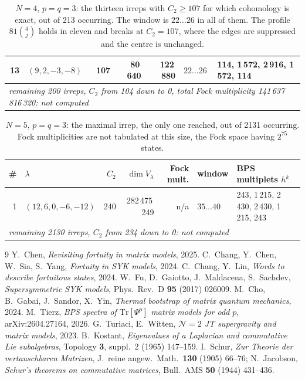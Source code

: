 \documentclass[10pt]{article}
\begin{document}
\begin{table}[p]
\begin{tabular}{rlrrrll}
13 & $(9,2,-3,-8)$ & 107 & 80\,640 & 122\,880 & $22\ldots26$ & 114, 1\,572, 2\,916, 1\,572, 114\\
\midrule
\multicolumn{7}{l}{\emph{remaining 200 irreps, $C_2$ from 104 down to 0, total Fock multiplicity 141\,637\,816\,320: not computed}}\\
\bottomrule\end{tabular}
\caption{$N=4$, $p=q=3$: the thirteen irreps with $C_2\ge107$ for which cohomology is exact, out of 213 occurring. The window is $22\ldots26$ in all of them. The profile $81\binom4j$ holds in eleven and breaks at $C_2=107$, where the edges are suppressed and the centre is unchanged.}\label{tab:app4}
\end{table}

\begin{table}[p]\centering\small
\begin{tabular}{rlrrrll}
\toprule
\# & $\lambda$ & $C_2$ & $\dim V_\lambda$ & Fock mult. & window & BPS multiplets $h^k$\\
\midrule
1 & $(12,6,0,-6,-12)$ & 240 & 282\,475\,249 & n/a & $35\ldots40$ & 243, 1\,215, 2\,430, 2\,430, 1\,215, 243\\
\midrule
\multicolumn{7}{l}{\emph{remaining 2130 irreps, $C_2$ from 234 down to 0: not computed}}\\
\bottomrule\end{tabular}
\caption{$N=5$, $p=q=3$: the maximal irrep, the only one reached, out of 2131 occurring. Fock multiplicities are not tabulated at this size, the Fock space having $2^{75}$ states.}\label{tab:app5}
\end{table}

\begin{thebibliography}{9}\small
{} Y.~Chen, \emph{Revisiting fortuity in matrix models}, 2025.
 C.~Chang, Y.~Chen, W.~Sia, S.~Yang, \emph{Fortuity in SYK models}, 2024.
 C.~Chang, Y.~Lin, \emph{Words to describe fortuitous states}, 2024.
 W.~Fu, D.~Gaiotto, J.~Maldacena, S.~Sachdev, \emph{Supersymmetric SYK models},
Phys.\ Rev.\ D \textbf{95} (2017) 026009.
 M.~Cho, B.~Gabai, J.~Sandor, X.~Yin, \emph{Thermal bootstrap of matrix quantum mechanics}, 2024.
 M.~Tierz, \emph{BPS spectra of $\mathrm{Tr}[\Psi^p]$ matrix models for odd $p$},
arXiv:2604.27164, 2026.
 G.~Turiaci, E.~Witten, \emph{$\mathcal N=2$ JT supergravity and matrix models}, 2023.
 B.~Kostant, \emph{Eigenvalues of a Laplacian and commutative Lie subalgebras}, Topology
\textbf{3}, suppl.~2 (1965) 147--159.
 I.~Schur, \emph{Zur Theorie der vertauschbaren Matrizen}, J.\ reine angew.\ Math.\ \textbf{130}
(1905) 66--76; N.~Jacobson, \emph{Schur's theorems on commutative matrices}, Bull.\ AMS \textbf{50} (1944)
431--436.
\end{thebibliography}
\end{document}
